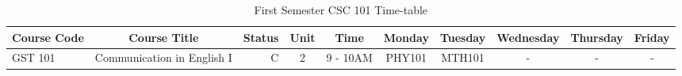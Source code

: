 \documentclass{article}
\begin{document}
\begin{sidewaystable}[h!]
	\begin{center}
		\caption{First Semester CSC 101 Time-table}
		\label{tab:table1}
		\begin{tabular}{l|c|r|c|c|c|c|c|c|c|}
		  \textbf{Course Code} & \textbf{Course Title} & \textbf{Status} & \textbf{Unit} & \textbf{Time} &
	      \textbf{Monday} & \textbf{Tuesday} & \textbf{Wednesday} & \textbf{Thursday} & \textbf{Friday}\\
		  \hline
	   	  GST 101 & Communication in English I & C & 2 & 9 - 10AM & PHY101 & MTH101 & - & - & - \\
		\end{tabular}
	\end{center}
\end{sidewaystable}
\end{document}
